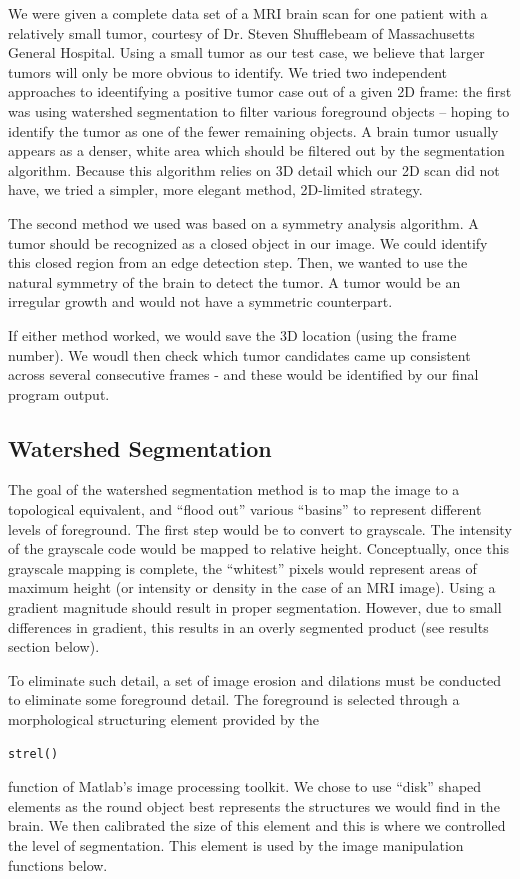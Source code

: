 \documentclass[12pt]{article}
\theoremstyle{plain}%
\theoremstyle{definition}
\theoremstyle{remark}
\begin{document}
We were given a complete data set of a MRI brain scan for one patient with a relatively small tumor, courtesy of Dr. Steven Shufflebeam of Massachusetts General Hospital.  Using a small tumor as our test case, we believe that larger tumors will only be more obvious to identify.
We tried two independent approaches to ideentifying a positive tumor case out of a given 2D frame: the first was using watershed segmentation to filter various foreground objects – hoping to identify the tumor as one of the fewer remaining objects.  A brain tumor usually appears as a denser, white area which should be filtered out by the segmentation algorithm.  Because this algorithm relies on 3D detail which our 2D scan did not have, we tried a simpler, more elegant method, 2D-limited strategy.

The second method we used was based on a symmetry analysis algorithm.  A tumor should be recognized as a closed object in our image.  We could identify this closed region from an edge detection step.  Then, we wanted to use the natural symmetry of the brain to detect the tumor.  A tumor would be an irregular growth and would not have a symmetric counterpart.

If either method worked, we would save the 3D location (using the frame number).  We woudl then check which tumor candidates came up consistent across several consecutive frames - and these would be identified by our final program output.
\subsection{Watershed Segmentation}

The goal of the watershed segmentation method is to map the image to a topological equivalent, and “flood out” various “basins” to represent different levels of foreground.  The first step would be to convert to grayscale.  The intensity of the grayscale code would be mapped to relative height.  Conceptually, once this grayscale mapping is complete, the “whitest” pixels would represent areas of maximum height (or intensity or density in the case of an MRI image).  Using a gradient magnitude should result in proper segmentation.  However, due to small differences in gradient, this results in an overly segmented product (see results section below).

To eliminate such detail, a set of image erosion and dilations must be conducted to eliminate some foreground detail.  The foreground is selected through a morphological structuring element provided by the \begin{verbatim}strel()\end{verbatim} function of Matlab’s image processing toolkit.  We chose to use “disk” shaped elements as the round object best represents the structures we would find in the brain.  We then calibrated the size of this element and this is where we controlled the level of segmentation.  This element is used by the image manipulation functions below.
\end{document}
